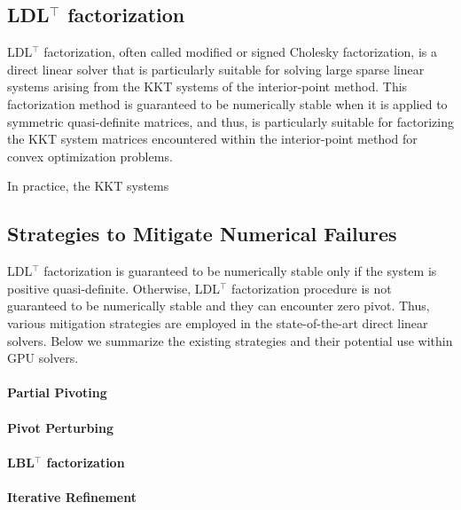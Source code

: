 \documentclass{article}
\begin{document}
\subsection{LDL$^\top$ factorization}
LDL$^\top$ factorization, often called modified or signed Cholesky factorization, is a direct linear solver that is particularly suitable for solving large sparse linear systems arising from the KKT systems of the interior-point method.
This factorization method is guaranteed to be numerically stable when it is applied to symmetric quasi-definite matrices, and thus, is particularly suitable for factorizing the KKT system matrices encountered within the interior-point method for convex optimization problems.

In practice, the KKT systems 


\subsection{Strategies to Mitigate Numerical Failures}

LDL$^\top$ factorization is guaranteed to be numerically stable only if the system is positive quasi-definite.
Otherwise, LDL$^\top$ factorization procedure is not guaranteed to be numerically stable and they can encounter zero pivot.
Thus, various mitigation strategies are employed in the state-of-the-art direct linear solvers.
Below we summarize the existing strategies and their potential use within GPU solvers.

\paragraph{Partial Pivoting}
\paragraph{Pivot Perturbing}
\paragraph{LBL$^\top$ factorization}
\paragraph{Iterative Refinement}
\end{document}
